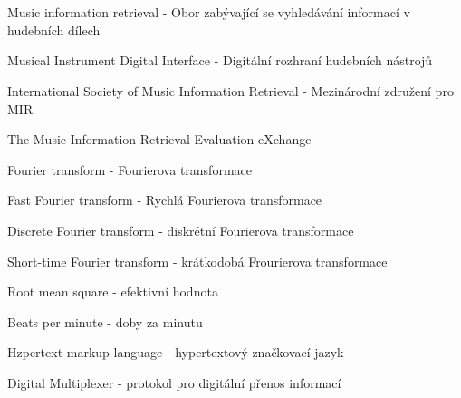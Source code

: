\cleardoublepage
\chapter*{\listofabbrevname}
{}

\begin{acronym}[KolikMista]
		{Music information retrieval - Obor zabývající se vyhledávání informací v hudebních dílech}
	
		{Musical Instrument Digital Interface - Digitální rozhraní hudebních nástrojů}

		{International Society of Music Information Retrieval - Mezinárodní združení pro \acs*{MIR}}	

		{The Music Information Retrieval Evaluation eXchange}

		{Fourier transform - Fourierova transformace}
		
		{Fast Fourier transform - Rychlá Fourierova transformace}

		{Discrete Fourier transform - diskrétní Fourierova transformace}

		{Short-time Fourier transform - krátkodobá Frourierova transformace}
	
		{Root mean square - efektivní hodnota}

		{Beats per minute - doby za minutu}

		{Hzpertext markup language -  hypertextový značkovací jazyk}

		{Digital Multiplexer - protokol pro digitální přenos informací}
\end{acronym}
